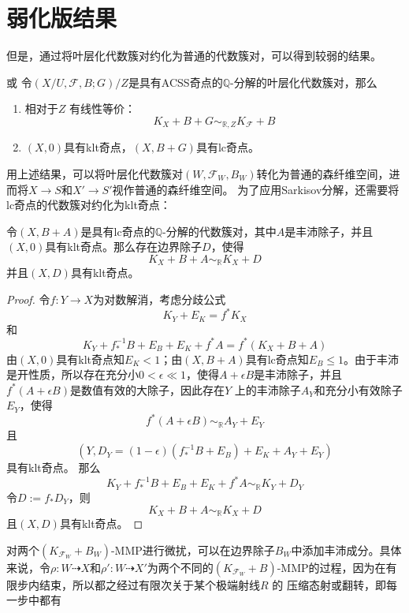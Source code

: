 \section{弱化版结果}
但是，通过将叶层化代数簇对约化为普通的代数簇对，可以得到较弱的结果。
\begin{theorem}\cite[Proposition 3.6]{acss}或\cite[Proposition 7.3.6]{chlx}  
  令$(X/U,\mathcal{F},B;G)/Z$是具有ACSS奇点的$\mathbb{Q}$-分解的叶层化代数簇对，那么
  \begin{enumerate}
    \item 相对于$Z$ 有线性等价：
      \[ K_{X}+B+G\sim_{\mathbb{R},Z}K_{\mathcal{F}}+B \]
    \item $(X,0)$具有klt奇点，$(X,B+G)$具有lc奇点。
  \end{enumerate}
\end{theorem}
用上述结果，可以将叶层化代数簇对$(W,\mathcal{F}_{W},B_{W})$转化为普通的森纤维空间，进而将$X\to S$和$X' \to S'$视作普通的森纤维空间。
为了应用Sarkisov分解，还需要将lc奇点的代数簇对约化为klt奇点：
\begin{lemma}\label{lctoklt}
 令$(X,B+A)$是具有lc奇点的$\mathbb{Q}$-分解的代数簇对，其中$A$是丰沛除子，并且$(X,0)$具有klt奇点。那么存在边界除子$D$，使得
 \[ K_{X}+B+A\sim_{\mathbb{R}}K_{X}+D \]
 并且$(X,D)$具有klt奇点。
\end{lemma}
\begin{proof}
  令$f:Y\to X$为对数解消，考虑分歧公式
  \[ K_{Y}+E_{K}=f^{*}K_{X} \]
  和
  \[ K_{Y}+f^{-1}_{*}B+E_{B}+E_{K}+f^{*}A=f^{*}(K_{X}+B+A) \]
  由$(X,0)$具有klt奇点知$E_{K}< 1 $；由$(X,B+A)$具有lc奇点知$E_{B}\leqslant 1$。由于丰沛是开性质，所以存在充分小$0< \epsilon \ll 1$，使得$A+\epsilon B$是丰沛除子，并且$f^{*}(A+\epsilon B)$是数值有效的大除子，因此存在$Y$ 上的丰沛除子$A_{Y}$和充分小有效除子$E_{Y}$，使得
  \[ f^{*}(A+\epsilon B)\sim_{\mathbb{R}} A_{Y}+E_{Y} \]
  且
  \[ \left(Y,D_{Y}=(1-\epsilon)(f^{-1}_{*}B+E_{B})+E_{K}+A_{Y}+E_{Y}\right) \]
  具有klt奇点。 那么
  \[ K_{Y}+f^{-1}_{*}B+E_{B}+E_{K}+f^{*}A\sim_{\mathbb{R}} K_{Y}+D_{Y} \]
  令$D:=f_{*}D_{Y}$，则
  \[ K_{X}+B+A\sim_{\mathbb{R}} K_{X}+D \]
  且$(X,D)$具有klt奇点。
\end{proof}
对两个$(K_{\mathcal{F}_{W}}+B_{W})$-MMP进行微扰，可以在边界除子$B_{W}$中添加丰沛成分。具体来说，令$\rho:W \dashrightarrow X$和$\rho': W \dashrightarrow X'$为两个不同的$(K_{\mathcal{F}_{W}}+B)$-MMP的过程，因为在有限步内结束，所以都之经过有限次关于某个极端射线$R$ 的 压缩态射或翻转，即每一步中都有
